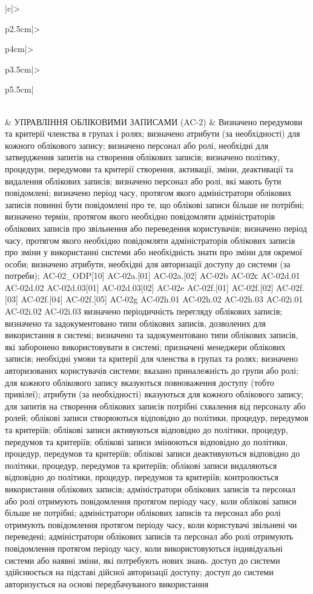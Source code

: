 \documentclass[10pt]{article}
\begin{document}
\begin{longtable}{|c|>{\raggedright\arraybackslash}p{2.5cm}|>{\raggedright\arraybackslash}p{4cm}|>{\raggedright\arraybackslash}p{3.5cm}|>{\raggedright\arraybackslash}p{5.5cm}|}
 \\  & УПРАВЛІННЯ ОБЛІКОВИМИ ЗАПИСАМИ (AC-2) & Визначено передумови та критерії членства в групах і ролях; визначено атрибути (за необхідності) для кожного облікового запису; визначено персонал або ролі, необхідні для затвердження запитів на створення облікових записів; визначено політику, процедури, передумови та критерії створення, активації, зміни, деактивації та видалення облікових записів; визначено персонал або ролі, які мають бути повідомлені; визначено період часу, протягом якого адміністратори облікових записів повинні бути повідомлені про те, що облікові записи більше не потрібні; визначено термін, протягом якого необхідно повідомляти адміністраторів облікових записів про звільнення або переведення користувачів; визначено період часу, протягом якого необхідно повідомляти адміністраторів облікових записів про зміни у використанні системи або необхідність знати про зміни для окремої особи; визначено атрибути, необхідні для авторизації доступу до системи (за потреби); AC-02\_\allowbreak{}ODP[10] AC-02a.[01] AC-02a.[02] AC-02b AC-02с AC-02d.01 AC-02d.02 AC-02d.03[01] AC-02d.03[02] AC-02e AC-02f.[01] AC-02f.[02] AC-02f.[03] AC-02f.[04] AC-02f.[05] AC-02g AC-02h.01 AC-02h.02 AC-02h.03 AC-02i.01 AC-02i.02 AC-02i.03 визначено періодичність перегляду облікових записів; визначено та задокументовано типи облікових записів, дозволених для використання в системі; визначено та задокументовано типи облікових записів, які заборонено використовувати в системі; призначені менеджери облікових записів; необхідні умови та критерії для членства в групах та ролях; визначено авторизованих користувачів системи; вказано приналежність до групи або ролі; для кожного облікового запису вказуються повноваження доступу (тобто привілеї); атрибути (за необхідності) вказуються для кожного облікового запису; для запитів на створення облікових записів потрібні схвалення від персоналу або ролей; облікові записи створюються відповідно до політики, процедур, передумов та критеріїв; облікові записи активуються відповідно до політики, процедур, передумов та критеріїв; облікові записи змінюються відповідно до політики, процедур, передумов та критеріїв; облікові записи деактивуються відповідно до політики, процедур, передумов та критеріїв; облікові записи видаляються відповідно до політики, процедур, передумов та критеріїв; контролюється використання облікових записів; адміністратори облікових записів та персонал або ролі отримують повідомлення протягом періоду часу, коли облікові записи більше не потрібні; адміністратори облікових записів та персонал або ролі отримують повідомлення протягом періоду часу, коли користувачі звільнені чи переведені; адміністратори облікових записів та персонал або ролі отримують повідомлення протягом періоду часу, коли використовуються індивідуальні системи або наявні зміни, які потребують нових знань. доступ до системи здійснюється на підставі дійсної авторизації доступу; доступ до системи авторизується на основі передбачуваного використання 
\end{longtable}
\end{document}
